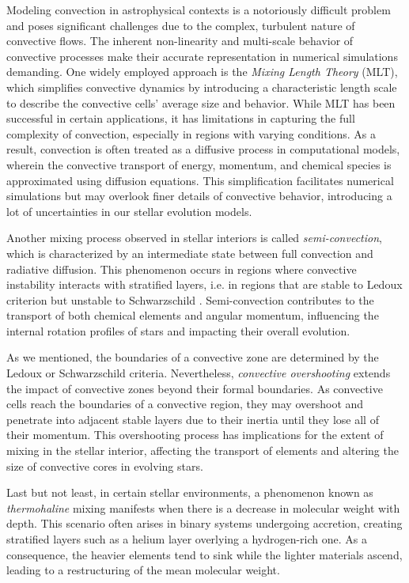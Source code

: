 \documentclass[main.tex]{subfiles}
\begin{document}
    Modeling convection in astrophysical contexts is a notoriously difficult problem and poses significant challenges due to the complex, turbulent nature of convective flows. The inherent non-linearity and multi-scale behavior of convective processes make their accurate representation in numerical simulations demanding. One widely employed approach is the \textit{Mixing Length Theory} (MLT), which simplifies convective dynamics by introducing a characteristic length scale to describe the convective cells' average size and behavior. While MLT has been successful in certain applications, it has limitations in capturing the full complexity of convection, especially in regions with varying conditions. As a result, convection is often treated as a diffusive process in computational models, wherein the convective transport of energy, momentum, and chemical species is approximated using diffusion equations. This simplification facilitates numerical simulations but may overlook finer details of convective behavior, introducing a lot of uncertainties in our stellar evolution models.

    Another mixing process observed in stellar interiors is called \textit{semi-convection}, which is characterized by an intermediate state between full convection and radiative diffusion. This phenomenon occurs in regions where convective instability interacts with stratified layers, i.e. in regions that are stable to Ledoux criterion but unstable to Schwarzschild \citep[see][]{spruit:semiconvection}. Semi-convection contributes to the transport of both chemical elements and angular momentum, influencing the internal rotation profiles of stars and impacting their overall evolution.

    As we mentioned, the boundaries of a convective zone are determined by the Ledoux or Schwarzschild criteria. Nevertheless, \textit{convective overshooting} extends the impact of convective zones beyond their formal boundaries. As convective cells reach the boundaries of a convective region, they may overshoot and penetrate into adjacent stable layers due to their inertia until they lose all of their momentum. This overshooting process has implications for the extent of mixing in the stellar interior, affecting the transport of elements and altering the size of convective cores in evolving stars.
    
    Last but not least, in certain stellar environments, a phenomenon known as \textit{thermohaline} mixing manifests when there is a decrease in molecular weight with depth. This scenario often arises in binary systems undergoing accretion, creating stratified layers such as a helium layer overlying a hydrogen-rich one. As a consequence, the heavier elements tend to sink while the lighter materials ascend, leading to a restructuring of the mean molecular weight.
\end{document}
